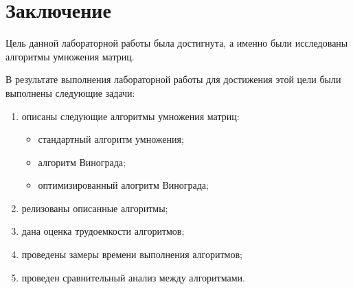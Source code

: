 \chapter*{Заключение}

Цель данной лабораторной работы была достигнута, а именно были исследованы алгоритмы умножения матриц.

В результате выполнения лабораторной работы для достижения этой цели были выполнены следующие задачи:
\begin{enumerate}
    \item описаны следующие алгоритмы умножения матриц:
        \begin{itemize}
            \item стандартный алгоритм умножения;
            \item алгоритм Винограда;
            \item оптимизированный алогритм Винограда;
        \end{itemize}
    \item релизованы описанные алгоритмы;
    \item дана оценка трудоемкости алгоритмов;
    \item проведены замеры времени выполнения алгоритмов;
    \item проведен сравнительный анализ между алгоритмами.
\end{enumerate}